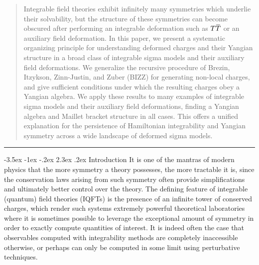 \documentclass[12pt]{article}
\makeatletter
\renewcommand\section{\@startsection {section}{1}{\z@}%
                                   {-3.5ex \@plus -1ex \@minus -.2ex}%
                                   {2.3ex \@plus.2ex}%
                                   {\normalfont\large\bfseries}}
\numberwithin{equation}{section}
\newcommand{\overbar}[1]{\mkern 1.5mu\overline{\mkern-1.5mu#1\mkern-1.5mu}\mkern 1.5mu}
\def\TT{{T\overbar{T}}}
\makeatother
\begin{document}
\begin{titlepage}
\begin{abstract}
\baselineskip=14pt




\noindent Integrable field theories exhibit infinitely many symmetries which underlie their solvability, but the structure of these symmetries can become obscured after performing an integrable deformation such as $\TT$ or an auxiliary field deformation. In this paper, we present a systematic organizing principle for understanding deformed charges and their Yangian structure in a broad class of integrable sigma models and their auxiliary field deformations. We generalize the recursive procedure of Brezin, Itzykson, Zinn-Justin, and Zuber (BIZZ) for generating non-local charges, and give sufficient conditions under which the resulting charges obey a Yangian algebra. We apply these results to many examples of integrable sigma models and their auxiliary field deformations, finding a Yangian algebra and Maillet bracket structure in all cases. This offers a unified explanation for the persistence of Hamiltonian integrability and Yangian symmetry across a wide landscape of deformed sigma models.
\end{abstract}
\vspace{5mm}


\vfill
\end{titlepage}

\newpage
\renewcommand{\thefootnote}{\arabic{footnote}}
\setcounter{footnote}{0}


\tableofcontents{}
\vspace{1cm}
\bigskip\hrule




\allowdisplaybreaks


\section{Introduction}
It is one of the mantras of modern physics that the more symmetry a theory possesses, the more tractable it is, since the conservation laws arising from such symmetry often provide simplifications and ultimately better control over the theory. The defining feature of integrable (quantum) field theories (IQFTs) is the presence of an infinite tower of conserved charges, which render such systems extremely powerful theoretical laboratories where it is sometimes possible to leverage the exceptional amount of symmetry in order to exactly compute quantities of interest. It is indeed often the case that observables computed with integrability methods are completely inaccessible otherwise, or perhaps can only be computed in some limit using perturbative techniques.
\end{document}
